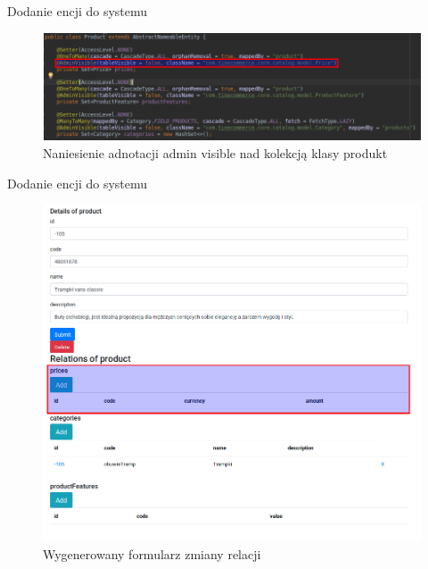 \documentclass[polish,xcolor=table,9pt,aspectratio=1610,hyperref={pdfpagemode=FullScreen}]{beamer}
\begin{document}
\begin{frame}{Dodanie encji do systemu}
\begin{figure}
	\begin{center}
		\includegraphics[scale=0.35]{7.png}
\end{center}
\caption{{\color{black}Naniesienie adnotacji admin visible nad kolekcją klasy produkt}} 
\end{figure}
\end{frame}

\begin{frame}{Dodanie encji do systemu}
\begin{figure}
	\begin{center}
		\includegraphics[scale=0.2]{8.png}
\end{center}
\caption{{\color{black}Wygenerowany formularz zmiany relacji}} 
\end{figure}
\end{frame}
\end{document}
